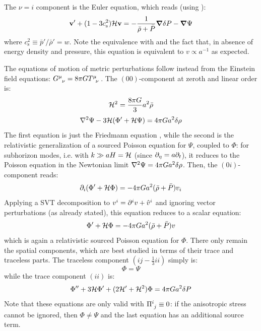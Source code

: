 The $ \nu = i $ component is the Euler equation, which reads (using ):
\begin{equation}
  \mathbf{v}' + (1 - 3 c_\text{s}^2) \mathcal{H} \mathbf{v} = - \frac{1}{\bar \rho + \bar P} \boldsymbol{\nabla} \delta P - \boldsymbol{\nabla} \Psi
\end{equation}
where $ c_\text{s}^2 \equiv \bar p' / \bar \rho' = w $. Note the equivalence with  and the fact that, in absence of energy density and pressure, this equation is equivalent to $ v \propto a^{-1} $ as expected.

The equations of motion of metric perturbations follow instead from the Einstein field equations: $ \tensor{G}{^\mu_\nu} = 8\pi G \tensor{T}{^\mu_\nu} $. The $ (00) $-component at zeroth and linear order is:
\begin{equation}
  \mathcal{H}^2 = \frac{8\pi G}{3} a^2 \bar \rho
  \label{eq:001}
\end{equation}
\begin{equation}
  \nabla^2 \Psi - 3 \mathcal{H} (\Phi' + \mathcal{H} \Psi) = 4\pi G a^2 \delta \rho
  \label{eq:002}
\end{equation}
The first equation is just the Friedmann equation , while the second is the relativistic generalization of a sourced Poisson equation for $ \Psi $, coupled to $ \Phi $: for subhorizon modes, i.e. with $ k \gg a H = \mathcal{H} $ (since $ \partial_\eta = a \partial_t $), it reduces to the Poisson equation in the Newtonian limit $ \nabla^2 \Psi = 4\pi G a^2 \delta \rho $. Then, the $ (0i) $-component reads:
\begin{equation*}
  \partial_i (\Phi' + \mathcal{H} \Phi) = -4\pi G a^2 (\bar \rho + \bar P) v_i
\end{equation*}
Applying a SVT decomposition to $ v^i = \partial^i v + \hat v^i $ and ignoring vector perturbations (as already stated), this equation reduces to a scalar equation:
\begin{equation}
  \Phi' + \mathcal{H} \Phi = - 4\pi G a^2 (\bar \rho + \bar P) v
  \label{eq:0i}
\end{equation}
which is again a relativistic sourced Poisson equation for $ \Phi $. There only remain the spatial components, which are best studied in terms of their trace and traceless parts. The traceless component $ (ij - \frac{1}{3} ii) $ simply is:
\begin{equation}
  \Phi = \Psi
\end{equation}
while the trace component $ (ii) $ is:
\begin{equation}
  \Phi'' + 3\mathcal{H} \Phi' + (2\mathcal{H}' + \mathcal{H}^2) \Phi = 4\pi G a^2 \delta P
  \label{eq:ii}
\end{equation}
Note that these equations are only valid with $ \tensor{\Pi}{^i_j} \equiv 0 $: if the anisotropic stress cannot be ignored, then $ \Phi \neq \Psi $ and the last equation has an additional source term.

